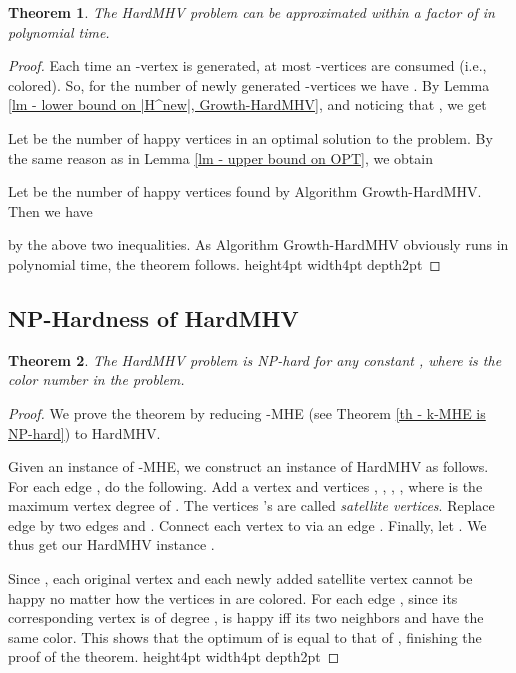 \documentclass[11pt]{article}
\newtheorem{theorem}{Theorem}[section]
\newcommand{\qed}{\vrule height4pt width4pt depth2pt}
\begin{document}
\begin{theorem}
The HardMHV problem can be approximated within a factor of
 in polynomial time.
\end{theorem}
\begin{proof}
Each time an -vertex is generated, at most  -vertices are consumed
(i.e., colored). So, for the number of newly generated -vertices we have
.
By Lemma \ref{lm - lower bound on |H^new|, Growth-HardMHV}, and noticing
that , we get


Let  be the number of happy vertices in an optimal solution to
the problem. By the same reason as in Lemma \ref{lm - upper bound on OPT},
we obtain


Let  be the number of happy vertices found by Algorithm
{\sc Growth-HardMHV}. Then we have

by the above two inequalities.
As Algorithm {\sc Growth-HardMHV} obviously runs in polynomial time,
the theorem follows.
\qed
\end{proof}




\subsection{NP-Hardness of HardMHV}
\begin{theorem}
The HardMHV problem is NP-hard for any constant , where  is
the color number in the problem.
\end{theorem}
\begin{proof}
We prove the theorem by reducing -MHE (see Theorem \ref{th - k-MHE is NP-hard})
to HardMHV.

Given an instance  of -MHE, we construct an instance 
of HardMHV as follows. For each edge , do the following.
Add a vertex  and  vertices
, , , , where  is
the maximum vertex degree of . The vertices 's are called
{\em satellite vertices}.
Replace edge  by two edges  and .
Connect each vertex  to  via an edge .
Finally, let . We thus get our HardMHV instance
.

Since , each original vertex  and each newly
added satellite vertex cannot be happy no matter how the vertices in 
are colored. For each edge , since its corresponding vertex
 is of degree ,  is happy iff its
two neighbors  and  have the same color. This shows that
the optimum of  is equal to that of , finishing
the proof of the theorem.
\qed
\end{proof}
\end{document}
